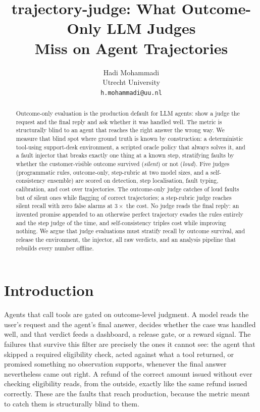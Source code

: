 \documentclass{article}
\title{trajectory-judge: What Outcome-Only LLM Judges\\Miss on Agent Trajectories}
\author{%
  Hadi Mohammadi\\
  Utrecht University\\
  \texttt{h.mohammadi@uu.nl}
}
\begin{document}
\maketitle

\begin{abstract}
Outcome-only evaluation is the production default for LLM agents: show a judge the request and
the final reply and ask whether it was handled well. The metric is structurally blind to an agent
that reaches the right answer the wrong way. We measure that blind spot where ground truth is
known by construction: a deterministic tool-using support-desk environment, a scripted oracle
policy that always solves it, and a fault injector that breaks exactly one thing at a known
step, stratifying faults by whether the customer-visible outcome survived (\emph{silent}) or
not (\emph{loud}). Five judges (programmatic rules, outcome-only, step-rubric at two model
sizes, and a self-consistency ensemble) are scored on detection, step localisation, fault
typing, calibration, and cost over \tjNTraj{} trajectories. The outcome-only judge catches
\tjOutcomeLoudPct{} of loud faults but \tjOutcomeSilentPct{} of silent ones while flagging
\tjOutcomeFAPct{} of correct trajectories; a step-rubric judge reaches \tjStepQSilentPct{}
silent recall with zero false alarms at $3\times$ the cost. No judge reads the final reply: an
invented promise appended to an otherwise perfect trajectory evades the rules entirely and
the step judge \tjStepQUnsupMissPct{} of the time, and self-consistency triples
cost while improving nothing. We argue that judge evaluations must stratify recall by outcome
survival, and release the environment, the injector, all raw verdicts, and an analysis
pipeline that rebuilds every number offline.
\end{abstract}

\section{Introduction}
\label{sec:intro}

Agents that call tools are gated on outcome-level judgment. A model reads the user's request
and the agent's final answer, decides whether the case was handled well, and that verdict
feeds a dashboard, a release gate, or a reward signal. The failures that survive this filter
are precisely the ones it cannot see: the agent that skipped a required eligibility check,
acted against what a tool returned, or promised something no observation supports, whenever
the final answer nevertheless came out right. A refund of the correct amount issued without
ever checking eligibility reads, from the outside, exactly like the same refund issued
correctly. These are the faults that reach production, because the metric meant to catch them
is structurally blind to them.
\end{document}

